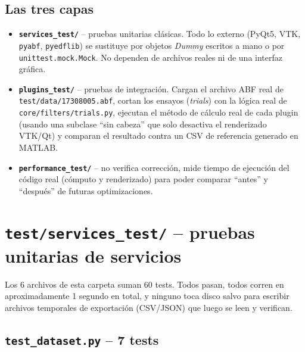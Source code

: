 \documentclass[11pt,a4paper]{article}
\begin{document}
\subsection{Las tres capas}

\begin{itemize}
  \item \textbf{\texttt{services\_\allowbreak test/}} -- pruebas unitarias clásicas. Todo lo externo (PyQt5, VTK,
        \texttt{pyabf}, \texttt{pyedflib}) se sustituye por objetos \textit{Dummy} escritos a mano o por
        \texttt{unittest.mock.Mock}. No dependen de archivos reales ni de una interfaz gráfica.
  \item \textbf{\texttt{plugins\_\allowbreak test/}} -- pruebas de integración. Cargan el archivo ABF real de
        \texttt{test/data/17308005.abf}, cortan los ensayos (\textit{trials}) con la lógica real de
        \texttt{core/filters/trials.py}, ejecutan el método de cálculo real de cada plugin (usando una
        subclase ``sin cabeza'' que solo desactiva el renderizado VTK/Qt) y comparan el resultado contra un
        CSV de referencia generado en MATLAB.
  \item \textbf{\texttt{performance\_\allowbreak test/}} -- no verifica corrección, mide tiempo de ejecución del código
        real (cómputo y renderizado) para poder comparar ``antes'' y ``después'' de futuras optimizaciones.
\end{itemize}

\newpage
\section{\texttt{test/services\_\allowbreak test/} -- pruebas unitarias de servicios}

Los 6 archivos de esta carpeta suman 60 tests. Todos pasan, todos corren en aproximadamente 1 segundo en
total, y ninguno toca disco salvo para escribir archivos temporales de exportación (CSV/JSON) que luego se
leen y verifican.

\subsection{\texttt{test\_\allowbreak dataset.py} -- 7 tests}
\end{document}

